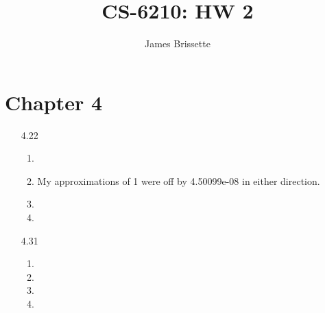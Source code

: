 \documentclass[11pt,a4paper]{article}
\author{James Brissette}
\title{CS-6210: HW 2}
\begin{document}
	\maketitle
	
	\section{Chapter 4}
		\begin{itemize}
			\item[4.22]
				\begin{enumerate} [label={\alph*)}]
					\item 
					\item My approximations of 1 were off by 4.50099e-08 in either direction.
					\item
					\item
				\end{enumerate}
					
			\item[4.31]
				\begin{enumerate} [label={\alph*)}]
					\item 
					\item
					\item
					\item
				\end{enumerate}
		\end{itemize}
		
\end{document}
